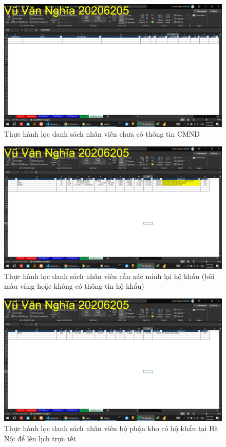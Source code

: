 \documentclass{article}
\begin{document}
\begin{figure}[H]
\centering
\includegraphics[scale = 0.15]{Video2/ThucHanh/5.png}
\caption{Thực hành lọc danh sách nhân viên chưa có thông tin CMND}
\end{figure}

\begin{figure}[H]
\centering
\includegraphics[scale = 0.15]{Video2/ThucHanh/6.png}
\caption{Thực hành lọc danh sách nhân viên cần xác minh lại hộ khẩu (bôi màu vàng hoặc không có thông tin hộ khẩu)}
\end{figure}

\begin{figure}[H]
\centering
\includegraphics[scale = 0.15]{Video2/ThucHanh/7.png}
\caption{Thực hành lọc danh sách nhân viên bộ phận kho có hộ khẩu tại Hà Nội để lên lịch trực tết}
\end{figure}
\end{document}
